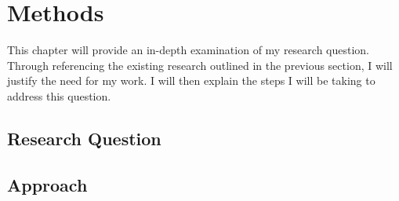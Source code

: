\chapter{Methods}

This chapter will provide an in-depth examination of my research question. Through referencing the existing research outlined in the previous section, I will justify the need for my work. I will then explain the steps I will be taking to address this question.

\section{Research Question}

\section{Approach}